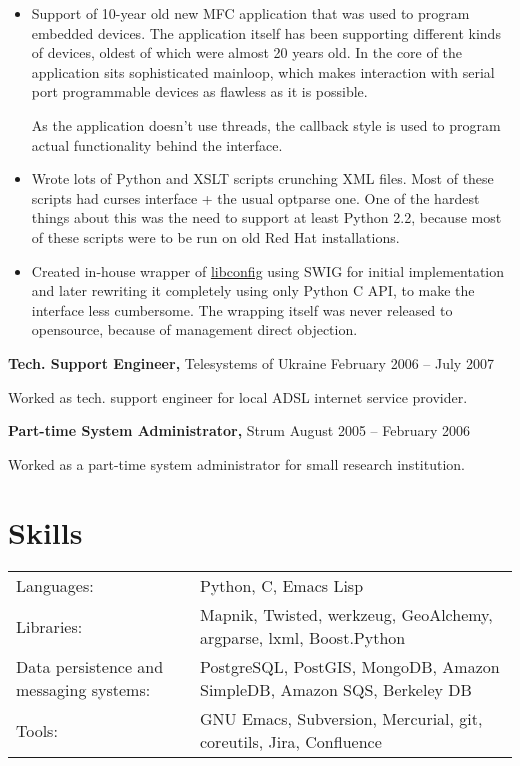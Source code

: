 \documentclass[margin]{res}
\begin{document}
\begin{resume}
\begin{itemize} \itemsep -1pt
\item Support of 10-year old new MFC application
  that was used to program embedded devices. The application itself
  has been supporting different kinds of devices, oldest of which
  were almost 20 years old. In the core of the application sits
  sophisticated mainloop, which makes interaction with serial port
  programmable devices as flawless as it is possible.




















  As the application doesn't use threads, the callback style is
  used to program actual functionality behind the interface.
\item Wrote lots of Python and XSLT scripts
  crunching XML files. Most of these scripts had curses interface +
  the usual optparse one. One of the hardest things about this was
  the need to support at least Python 2.2, because most of these scripts
  were to be run on old Red Hat installations.
\item Created in-house wrapper of
  \href{http://www.hyperrealm.com/libconfig/}{libconfig} using SWIG for initial
  implementation and later rewriting it completely using only Python C API, to make
  the interface less cumbersome. The wrapping itself was never released to
  opensource, because of management direct objection.
\end{itemize}



{\bf Tech. Support Engineer,} Telesystems of Ukraine \hfill February 2006 -- July 2007

Worked as tech. support engineer for local ADSL internet service provider.


{\bf Part-time System Administrator,} Strum \hfill August 2005 -- February 2006

Worked as a part-time system administrator for small research institution.


\section{Skills}
\begin{tabular}{l p{3in}}
  Languages: & Python, C, Emacs Lisp \\
  Libraries: & Mapnik, Twisted, werkzeug, GeoAlchemy, argparse, lxml, Boost.Python \\
  Data persistence and messaging systems: & PostgreSQL, PostGIS, MongoDB, Amazon SimpleDB, Amazon SQS, Berkeley DB \\
  Tools: & GNU Emacs, Subversion, Mercurial, git, coreutils, Jira, Confluence
\end{tabular}


\end{resume}
\end{document}
